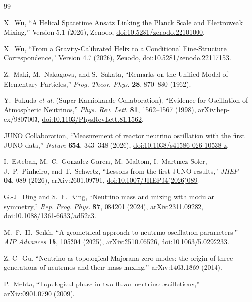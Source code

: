 \documentclass[10pt,twocolumn]{article}
\begin{document}
\begin{thebibliography}{99}

X.~Wu,
``A Helical Spacetime Ansatz Linking the Planck Scale and Electroweak Mixing,''
Version 5.1 (2026), Zenodo,
\href{https://doi.org/10.5281/zenodo.22101000}{doi:10.5281/zenodo.22101000}.

X.~Wu,
``From a Gravity-Calibrated Helix to a Conditional Fine-Structure Correspondence,''
Version 4.7 (2026), Zenodo,
\href{https://doi.org/10.5281/zenodo.22117153}{doi:10.5281/zenodo.22117153}.

Z.~Maki, M.~Nakagawa, and S.~Sakata,
``Remarks on the Unified Model of Elementary Particles,''
\emph{Prog. Theor. Phys.} \textbf{28}, 870--880 (1962).

Y.~Fukuda \emph{et al.} (Super-Kamiokande Collaboration),
``Evidence for Oscillation of Atmospheric Neutrinos,''
\emph{Phys. Rev. Lett.} \textbf{81}, 1562--1567 (1998),
arXiv:hep-ex/9807003,
\href{https://doi.org/10.1103/PhysRevLett.81.1562}
{doi:10.1103/PhysRevLett.81.1562}.

JUNO Collaboration,
``Measurement of reactor neutrino oscillation with the first JUNO data,''
\emph{Nature} \textbf{654}, 343--348 (2026),
\href{https://doi.org/10.1038/s41586-026-10538-z}
{doi:10.1038/s41586-026-10538-z}.

I.~Esteban, M.~C.~Gonzalez-Garcia, M.~Maltoni, I.~Martinez-Soler,
J.~P.~Pinheiro, and T.~Schwetz,
``Lessons from the first JUNO results,''
\emph{JHEP} \textbf{04}, 089 (2026),
arXiv:2601.09791,
\href{https://doi.org/10.1007/JHEP04(2026)089}
{doi:10.1007/JHEP04(2026)089}.

G.-J.~Ding and S.~F.~King,
``Neutrino mass and mixing with modular symmetry,''
\emph{Rep. Prog. Phys.} \textbf{87}, 084201 (2024),
arXiv:2311.09282,
\href{https://doi.org/10.1088/1361-6633/ad52a3}
{doi:10.1088/1361-6633/ad52a3}.

M.~F.~H.~Seikh,
``A geometrical approach to neutrino oscillation parameters,''
\emph{AIP Advances} \textbf{15}, 105204 (2025),
arXiv:2510.06526,
\href{https://doi.org/10.1063/5.0292233}{doi:10.1063/5.0292233}.

Z.-C.~Gu,
``Neutrino as topological Majorana zero modes: the origin of three generations of
neutrinos and their mass mixing,''
arXiv:1403.1869 (2014).

P.~Mehta,
``Topological phase in two flavor neutrino oscillations,''
arXiv:0901.0790 (2009).


\end{thebibliography}
\end{document}
